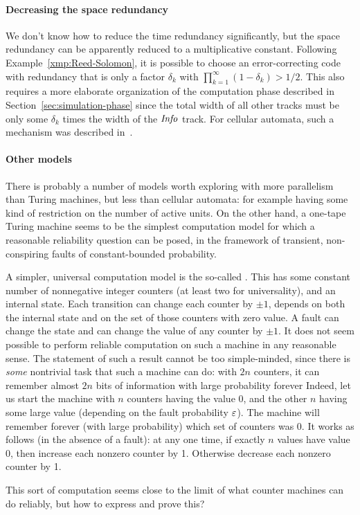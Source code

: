 \documentclass[11pt]{memoir}
\theoremstyle{definition} %
\newcommand{\fld}[1]{\ensuremath{\textit{#1\/}}}
\newcommand{\Info}{\fld{Info}}
\begin{document}
 \paragraph{Decreasing the space redundancy}
 We don't know how to reduce the time redundancy significantly, but
 the space redundancy can be apparently reduced to a multiplicative constant.
 Following Example~\ref{xmp:Reed-Solomon}, it is possible to
 choose an error-correcting code with redundancy that is only a factor \( \delta_{k} \)
 with \( 
   \prod_{k=1}^{\infty}(1-\delta_{k})>1/2
 \).
 This also requires a more elaborate organization of the computation phase described in
 Section~\ref{sec:simulation-phase} since
 the total width of all other tracks must be only some \( \delta_{k} \) times the width
 of the \( \Info \) track.
 For cellular automata, such a mechanism was described in~\cite{GacsSorg01}.

 \paragraph{Other models}
 There is probably a number of models worth exploring with more parallelism than Turing machines, but less
 than cellular automata: for example having some kind of restriction on the number of active units.
 On the other hand, a one-tape Turing machine seems to be the simplest computation model for which a reasonable
 reliability question can be posed, in the framework of transient, non-conspiring faults of constant-bounded
 probability.

 A simpler, universal computation model is the so-called .
 This has some constant number of nonnegative integer counters (at least two for universality), and an internal state.
 Each transition can change each counter by \( \pm 1 \), depends on both the internal state
 and on the set of those counters with zero value.
 A fault can change the state and can change the value of any counter by \( \pm 1 \).
 It does not seem possible to perform reliable computation on such a machine in any reasonable sense.
 The statement of such a result
 cannot be too simple-minded, since there is \emph{some} nontrivial task that such a machine can
 do: with \( 2n \) counters, it can remember almost \( 2n \) bits of information with large probability forever
 Indeed, let us start the machine with \( n \) counters having the value 0, and the other \( n \) having some
 large value (depending on the fault probability \( \varepsilon \)).
 The machine will remember forever (with large probability) which set of counters was 0.
 It works as follows (in the absence of a fault):
 at any one time, if exactly \( n \) values have value 0, then increase each nonzero counter by 1.
 Otherwise decrease each nonzero counter by 1.
 
 This sort of computation seems close to the limit of what counter machines can do reliably, but
 how to express and prove this?
 


\end{document}
